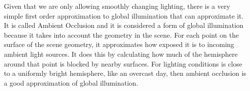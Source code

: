 \documentclass[10pt,twocolumn,letterpaper]{article}
\begin{document}
Given that we are only allowing smoothly changing lighting, there is a very simple first order approximation to global illumination that can approximate it. It is called Ambient Occlusion and it is considered a form of global illumination because it takes into account the geometry in the scene\cite{Miller:1994:EAL:192161.192244}.  For each point on the surface of the scene geometry, it approximates how exposed it is to incoming ambient light sources.  It does this by calculating how much of the hemisphere around that point is blocked by nearby surfaces. For lighting conditions is close to a uniformly bright hemisphere, like an overcast day, then ambient occlusion is a good approximation of global illumination. \\%


%
\end{document}
